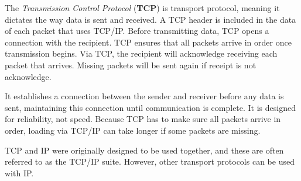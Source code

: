 The \emph{Transmission Control Protocol} (\textbf{TCP}) is transport protocol, meaning it dictates the way data is sent and received. A TCP header is included in the data of each packet that uses TCP/IP. Before transmitting data, TCP opens a connection with the recipient. TCP ensures that all packets arrive in order once transmission begins. Via TCP, the recipient will acknowledge receiving each packet that arrives. Missing packets will be sent again if receipt is not acknowledge.

It establishes a connection between the sender and receiver before any data is sent, maintaining this connection until communication is complete. It is designed for reliability, not speed. Because TCP has to make sure all packets arrive in order, loading via TCP/IP can take longer if some packets are missing.

TCP and IP were originally designed to be used together, and these are often referred to as the TCP/IP suite. However, other transport protocols can be used with IP.
